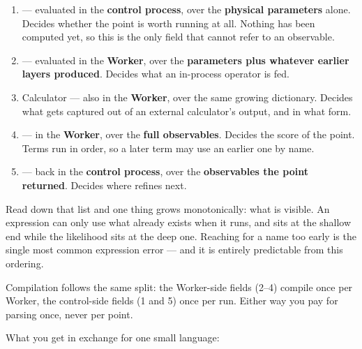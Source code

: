 \begin{enumerate}[leftmargin=1.6em]
  \item {} --- evaluated in the \textbf{control process},
        over the \textbf{physical parameters} alone. Decides whether the point is worth
        running at all. Nothing has been computed yet, so this is the only field that
        cannot refer to an observable.
  \item {} --- evaluated in the \textbf{Worker}, over
        the \textbf{parameters plus whatever earlier layers produced}. Decides what an
        in-process operator is fed.
  \item Calculator   --- also in the \textbf{Worker},
        over the same growing dictionary. Decides what gets captured out of an external
        calculator's output, and in what form.
  \item {} --- in the \textbf{Worker}, over the
        \textbf{full observables}. Decides the score of the point. Terms run in order,
        so a later term may use an earlier one by name.
  \item {} --- back in the \textbf{control process},
        over the \textbf{observables the point returned}. Decides where
         refines next.
\end{enumerate}

Read down that list and one thing grows monotonically: what is visible. An expression can
only use what already exists when it runs, and  sits at the shallow end
while the likelihood sits at the deep one. Reaching for a name too early is the single
most common expression error --- and it is entirely predictable from this ordering.

Compilation follows the same split: the Worker-side fields (2--4) compile once per Worker,
the control-side fields (1 and 5) once per run. Either way you pay for parsing once, never
per point.

What you get in exchange for one small language:

